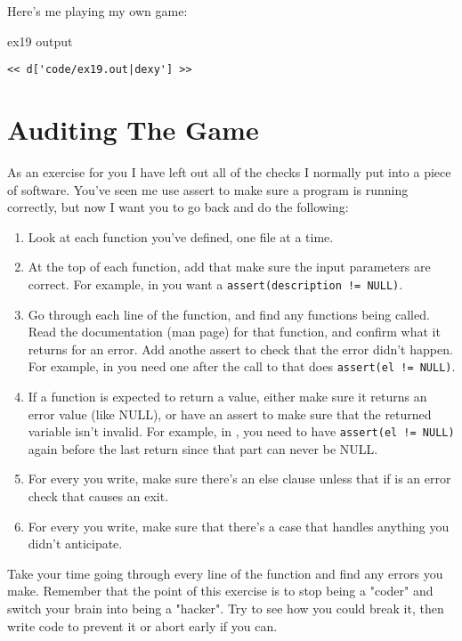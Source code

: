 Here's me playing my own game:

\begin{code}{ex19 output}
\begin{lstlisting}
<< d['code/ex19.out|dexy'] >>
\end{lstlisting}
\end{code}


\section{Auditing The Game}

As an exercise for you I have left out all of the  checks
I normally put into a piece of software.  You've seen me use assert to
make sure a program is running correctly, but now I want you to go back
and do the following:

\begin{enumerate}
\item Look at each function you've defined, one file at a time.
\item At the top of each function, add  that make sure
    the input parameters are correct.  For example, in 
    you want a \verb|assert(description != NULL)|.
\item Go through each line of the function, and find any functions
    being called.  Read the documentation (man page) for that function,
    and confirm what it returns for an error.  Add anothe assert to
    check that the error didn't happen.  For example, in 
    you need one after the call to  that does \verb|assert(el != NULL)|.
\item If a function is expected to return a value, either make sure it returns
    an error value (like NULL), or have an assert to make sure that the returned
    variable isn't invalid.  For example, in , you need
    to have \verb|assert(el != NULL)| again before the last return since
    that part can never be NULL.
\item For every  you write, make sure there's an else
    clause unless that if is an error check that causes an exit.
\item For every  you write, make sure that there's
    a  case that handles anything you didn't anticipate.
\end{enumerate}

Take your time going through every line of the function and find any errors you
make.  Remember that the point of this exercise is to stop being a "coder" and
switch your brain into being a "hacker".  Try to see how you could break it,
then write code to prevent it or abort early if you can.

